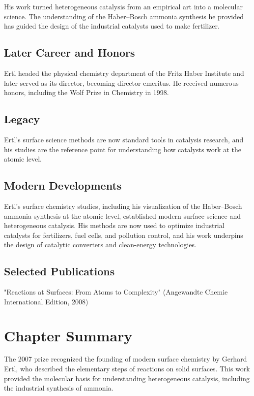 His work turned heterogeneous catalysis from an empirical art into a molecular science. The understanding of the Haber--Bosch ammonia synthesis he provided has guided the design of the industrial catalysts used to make fertilizer.

\subsection*{Later Career and Honors}

Ertl headed the physical chemistry department of the Fritz Haber Institute and later served as its director, becoming director emeritus. He received numerous honors, including the Wolf Prize in Chemistry in 1998.

\subsection*{Legacy}

Ertl's surface science methods are now standard tools in catalysis research, and his studies are the reference point for understanding how catalysts work at the atomic level.

\subsection*{Modern Developments}

Ertl's surface chemistry studies, including his visualization of the Haber–Bosch ammonia synthesis at the atomic level, established modern surface science and heterogeneous catalysis. His methods are now used to optimize industrial catalysts for fertilizers, fuel cells, and pollution control, and his work underpins the design of catalytic converters and clean-energy technologies.

\subsection*{Selected Publications}

"Reactions at Surfaces: From Atoms to Complexity" (Angewandte Chemie International Edition, 2008)

\clearpage

\section*{Chapter Summary}

The 2007 prize recognized the founding of modern surface chemistry by Gerhard Ertl, who described the elementary steps of reactions on solid surfaces. This work provided the molecular basis for understanding heterogeneous catalysis, including the industrial synthesis of ammonia.
